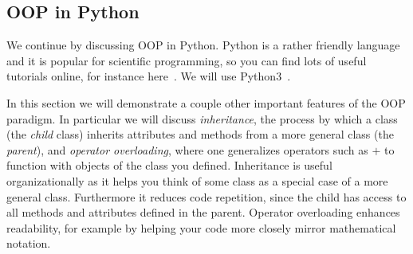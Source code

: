 \begin{code*}
\end{code*}
\begin{code*}
\end{code*}

\subsection{OOP in Python}

We continue by discussing OOP in Python. Python is a rather friendly language
and it is popular for scientific programming, so you can find lots of useful
tutorials online, for instance here~\cite{pythonOOP}. We will use
Python3~\cite{python3}.

In this section we will demonstrate
a couple other important features of the OOP paradigm. In particular we will
discuss {\it inheritance}, the process by which a
class (the {\it child} class) inherits attributes and methods
from a more general class (the {\it parent}), and
{\it operator overloading},  where one generalizes 
operators such as $+$ to function with objects of the class you defined.
Inheritance is useful organizationally as it helps you think of some class
as a special case of a more general class. Furthermore it reduces code
repetition, since the child has access to all methods and attributes defined in
the parent. Operator overloading enhances readability, for example by
helping your code more closely mirror mathematical notation.\\

\begin{code*}
\end{code*}

